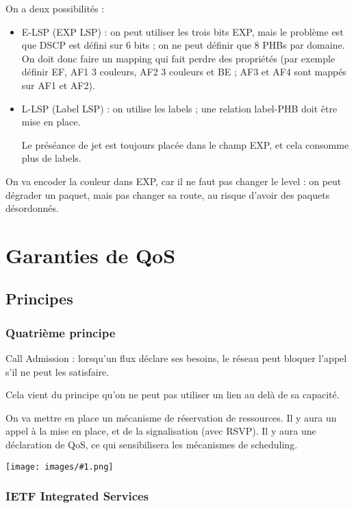 \documentclass[10pt,a4paper]{report}
\newcommand{\dessin}[1]{\begin{center}\texttt{[image: images/\#1.png]}\end{center}}
\begin{document}
			On a deux possibilités :
			
			\begin{itemize}
				\item E-LSP (EXP LSP) : on peut utiliser les trois bits EXP, mais le problème est que DSCP est défini sur 6 bits ; on ne peut définir que 8 PHBs par domaine. On doit donc faire un mapping qui fait perdre des propriétés (par exemple définir EF, AF1 3 couleurs, AF2 3 couleurs et BE ; AF3 et AF4 sont mappés sur AF1 et AF2).
				
					\item L-LSP (Label LSP) : on utilise les labels ; une relation label-PHB doit être mise en place.
					
					Le préséance de jet est toujours placée dans le champ EXP, et cela consomme plus de labels.
			\end{itemize}
			
			On va encoder la couleur dans EXP, car il ne faut pas changer le level : on peut dégrader un paquet, mais pas changer sa route, au risque d'avoir des paquets désordonnés.
		


	\section{Garanties de QoS}
			 
		\subsection{Principes}
		
			\subsubsection{Quatrième principe}
			
			Call Admission : lorsqu'un flux déclare ses besoins, le réseau peut bloquer l'appel s'il ne peut les satisfaire.
			
			Cela vient du principe qu'on ne peut pas utiliser un lien au delà de sa capacité.
			
			On va mettre en place un mécanisme de réservation de ressources. Il y aura un appel à la mise en place, et de la signalisation (avec RSVP).  Il y aura une déclaration de QoS, ce qui sensibilisera les mécanismes de scheduling.
			
			\dessin{120}
			
			\subsubsection{IETF Integrated Services}
			
\end{document}
